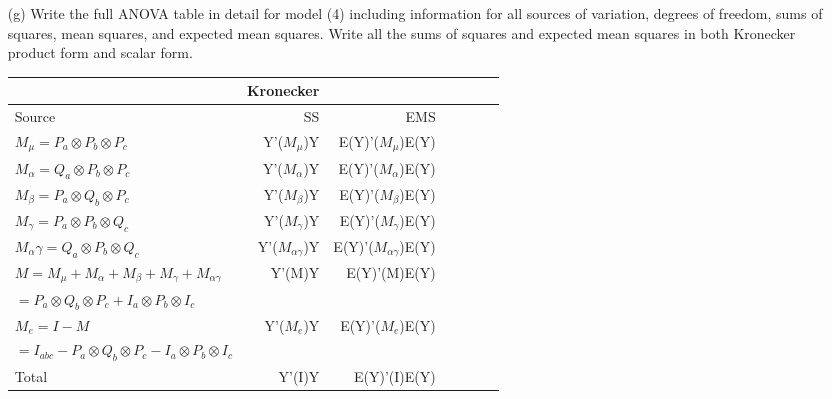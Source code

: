 \documentclass{homework}
\begin{document}
\begin{itemize}
\item[(g)] Write the full ANOVA table in detail for model (4) including information for all
sources of variation, degrees of freedom, sums of squares, mean squares, and expected
mean squares. Write all the sums of squares and expected mean squares in both
Kronecker product form and scalar form.\\
\begin{tabular}{l r r r r r r }
& Kronecker & & & \\\hline
Source & SS & EMS  \\\hline
$M_\mu=P_a \otimes P_b \otimes P_c$ &  Y'($M_\mu$)Y & E(Y)'($M_\mu$)E(Y)  \\
$M_\alpha=Q_a \otimes P_b \otimes P_c$	&  Y'($M_\alpha$)Y & E(Y)'($M_\alpha$)E(Y) \\
$M_\beta= P_a \otimes Q_b \otimes P_c$	& Y'($M_\beta$)Y & E(Y)'($M_\beta$)E(Y) \\
$M_\gamma=P_a \otimes P_b \otimes Q_c$	& Y'($M_\gamma$)Y & E(Y)'($M_\gamma$)E(Y) \\
$M_\alpha\gamma =Q_a \otimes P_b \otimes Q_c$	& Y'($M_{\alpha\gamma}$)Y & E(Y)'($M_{\alpha\gamma}$)E(Y) \\
$M = M_{\mu}+M_{\alpha} + M_{\beta} + M_{\gamma} + M_{\alpha\gamma} $	& Y'(M)Y & E(Y)'(M)E(Y) \\
$= P_a \otimes Q_b \otimes P_c + I_a \otimes P_b \otimes I_c$  \\
$M_e = I-M$	& Y'($M_e$)Y & E(Y)'($M_e$)E(Y) \\
$= I_{abc}- P_a \otimes Q_b \otimes P_c - I_a \otimes P_b \otimes I_c$  \\
Total	& Y'(I)Y & E(Y)'(I)E(Y) \\
\hline
\end{tabular}\\


\end{itemize}
\end{document}
